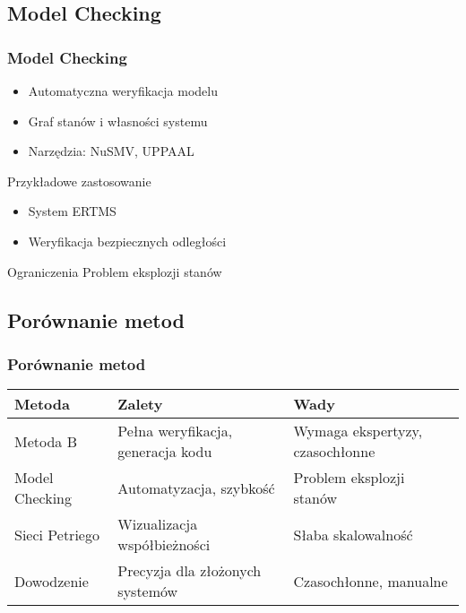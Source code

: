 \documentclass{beamer}
\begin{document}
\subsection{Model Checking}
\begin{frame}
\frametitle{Model Checking}
\begin{itemize}
\item Automatyczna weryfikacja modelu
\item Graf stanów i własności systemu
\item Narzędzia: NuSMV, UPPAAL
\end{itemize}

\begin{exampleblock}{Przykładowe zastosowanie}
\begin{itemize}
\item System ERTMS
\item Weryfikacja bezpiecznych odległości
\end{itemize}
\end{exampleblock}

\begin{alertblock}{Ograniczenia}
Problem eksplozji stanów
\end{alertblock}
\end{frame}

\subsection{Porównanie metod}
\begin{frame}
\frametitle{Porównanie metod}
\scriptsize
\begin{tabularx}{\textwidth}{|l|X|X|}
\hline
\textbf{Metoda} & \textbf{Zalety} & \textbf{Wady} \\
\hline
Metoda B &
Pełna weryfikacja, generacja kodu &
Wymaga ekspertyzy, czasochłonne \\
\hline
Model Checking &
Automatyzacja, szybkość &
Problem eksplozji stanów \\
\hline
Sieci Petriego &
Wizualizacja współbieżności &
Słaba skalowalność \\
\hline
Dowodzenie &
Precyzja dla złożonych systemów &
Czasochłonne, manualne \\
\hline
\end{tabularx}
\end{frame}
\end{document}
